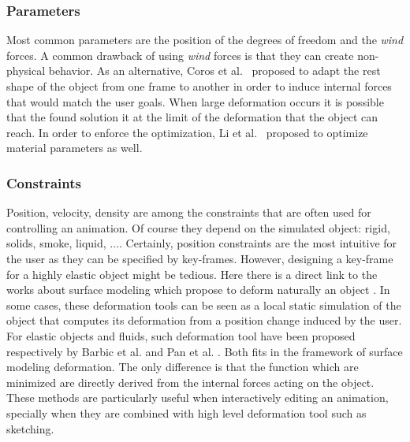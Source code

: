 \subsubsection{Parameters}
Most common parameters are the position of the degrees of freedom and the \emph{wind} forces. A common drawback of using \emph{wind} forces is that they can create non-physical behavior. As an alternative, Coros et al.~\cite{Coros2012} proposed to adapt the rest shape of the object from one frame to another in order to induce internal forces that would match the user goals. When large deformation occurs it is possible that the found solution it at the limit of the deformation that the object can reach. In order to enforce the optimization, Li et al.~\cite{Li2014} proposed to optimize material parameters as well. 

\subsubsection{Constraints}
Position, velocity, density are among the constraints that are often used for controlling an animation. Of course they depend on the simulated object: rigid, solids, smoke, liquid, $\dots$. Certainly, position constraints are the most intuitive for the user as they can be specified by key-frames. However, designing a key-frame for a highly elastic object might be tedious. Here there is a direct link to the works about surface modeling which propose to deform naturally an object \cite{Sorkine2007, Hildebrandt2011}. In some cases, these deformation tools can be seen as a local static simulation of the object that computes its deformation from a position change induced by the user. For elastic objects and fluids, such deformation tool have been proposed respectively by Barbic et al. \cite{Barbic2012} and Pan et al. \cite{Pan2013}. Both fits in the framework of surface modeling deformation. The only difference is that the function which are minimized are directly derived from the internal forces acting on the object. These methods are particularly useful when interactively editing an animation, specially when they are combined with high level deformation tool such as sketching.

